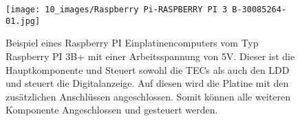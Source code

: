 \documentclass[a4paper,10pt]{scrartcl}
\begin{document}
\begin{figure}[H]
    \centering
    \texttt{[image: 10\_images/Raspberry Pi-RASPBERRY PI 3 B-30085264-01.jpg]}
    \caption{Beispiel eines Raspberry PI Einplatinencomputers vom Typ Raspberry PI 3B+ mit einer Arbeitsspannung von 5V. Dieser ist die Hauptkomponente und Steuert sowohl die TECs als auch den LDD und steuert die Digitalanzeige. Auf diesen wird die Platine mit den zusätzlichen Anschlüssen angeschlossen. Somit können alle weiteren Komponente Angeschlossen und gesteuert werden.}
    \label{fig:raspberry_pi}
\end{figure}

% 
% 
% 
\end{document}
